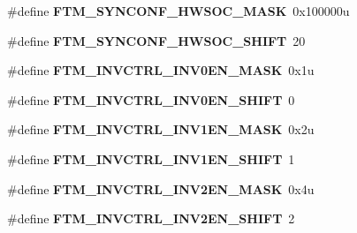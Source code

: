 \begin{DoxyCompactItemize}
\item 
\#define {\bfseries F\+T\+M\+\_\+\+S\+Y\+N\+C\+O\+N\+F\+\_\+\+H\+W\+S\+O\+C\+\_\+\+M\+A\+SK}~0x100000u\hypertarget{group__FTM__Register__Masks_ga87dd113da8487aa3082d39baeb54874d}{}\label{group__FTM__Register__Masks_ga87dd113da8487aa3082d39baeb54874d}

\item 
\#define {\bfseries F\+T\+M\+\_\+\+S\+Y\+N\+C\+O\+N\+F\+\_\+\+H\+W\+S\+O\+C\+\_\+\+S\+H\+I\+FT}~20\hypertarget{group__FTM__Register__Masks_ga1732b95468145109564e4fa367dfc2a8}{}\label{group__FTM__Register__Masks_ga1732b95468145109564e4fa367dfc2a8}

\item 
\#define {\bfseries F\+T\+M\+\_\+\+I\+N\+V\+C\+T\+R\+L\+\_\+\+I\+N\+V0\+E\+N\+\_\+\+M\+A\+SK}~0x1u\hypertarget{group__FTM__Register__Masks_ga29b0b3d76d82f4c673556bd71b97ee9d}{}\label{group__FTM__Register__Masks_ga29b0b3d76d82f4c673556bd71b97ee9d}

\item 
\#define {\bfseries F\+T\+M\+\_\+\+I\+N\+V\+C\+T\+R\+L\+\_\+\+I\+N\+V0\+E\+N\+\_\+\+S\+H\+I\+FT}~0\hypertarget{group__FTM__Register__Masks_ga15a13f74f3f9db42b9be7ce492976fef}{}\label{group__FTM__Register__Masks_ga15a13f74f3f9db42b9be7ce492976fef}

\item 
\#define {\bfseries F\+T\+M\+\_\+\+I\+N\+V\+C\+T\+R\+L\+\_\+\+I\+N\+V1\+E\+N\+\_\+\+M\+A\+SK}~0x2u\hypertarget{group__FTM__Register__Masks_gaaa85e1e86e9cc91e49e68c33a91d5194}{}\label{group__FTM__Register__Masks_gaaa85e1e86e9cc91e49e68c33a91d5194}

\item 
\#define {\bfseries F\+T\+M\+\_\+\+I\+N\+V\+C\+T\+R\+L\+\_\+\+I\+N\+V1\+E\+N\+\_\+\+S\+H\+I\+FT}~1\hypertarget{group__FTM__Register__Masks_ga6d544c535dc1c3710f37e5ed3f0e6acc}{}\label{group__FTM__Register__Masks_ga6d544c535dc1c3710f37e5ed3f0e6acc}

\item 
\#define {\bfseries F\+T\+M\+\_\+\+I\+N\+V\+C\+T\+R\+L\+\_\+\+I\+N\+V2\+E\+N\+\_\+\+M\+A\+SK}~0x4u\hypertarget{group__FTM__Register__Masks_ga529f3c3f58ca2c039fee08830dfe3a8a}{}\label{group__FTM__Register__Masks_ga529f3c3f58ca2c039fee08830dfe3a8a}

\item 
\#define {\bfseries F\+T\+M\+\_\+\+I\+N\+V\+C\+T\+R\+L\+\_\+\+I\+N\+V2\+E\+N\+\_\+\+S\+H\+I\+FT}~2\hypertarget{group__FTM__Register__Masks_gaf304b51f57fe6a028674e4de62558868}{}\label{group__FTM__Register__Masks_gaf304b51f57fe6a028674e4de62558868}


\end{DoxyCompactItemize}
